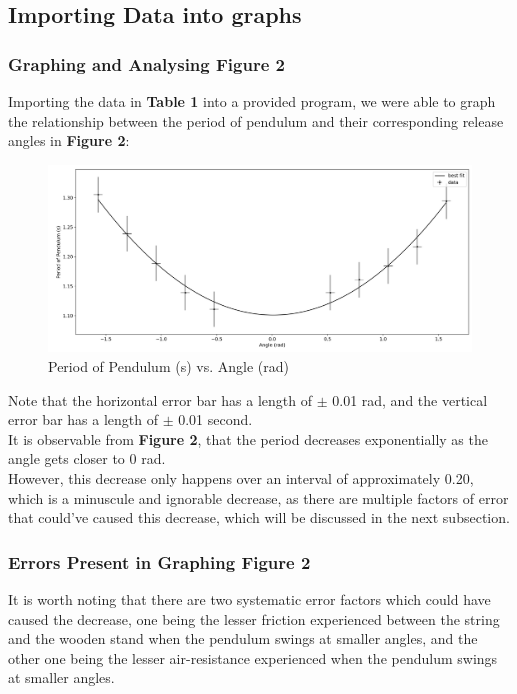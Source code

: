 \documentclass{article}
\begin{document}
\subsection{Importing Data into graphs}

\subsubsection{Graphing and Analysing Figure 2}

Importing the data in \textbf{Table 1} into a provided program, we were able to graph the relationship between the period of pendulum and their corresponding release angles in \textbf{Figure 2}:\\

\begin{figure}[!htb]
	\includegraphics[scale=0.4]{fig_angle.png}
	\caption{Period of Pendulum (s) vs. Angle (rad)}
	\label{fig_angle}
\end{figure}

\noindent Note that the horizontal error bar has a length of $\pm$ 0.01 rad, and the vertical error bar has a length of $\pm$ 0.01 second. \\

\noindent It is observable from \textbf{Figure 2}, that the period decreases exponentially as the angle gets closer to 0 rad. \\

\noindent However, this decrease only happens over an interval of approximately 0.20, which is a minuscule and ignorable decrease, as there are multiple factors of error that could've caused this decrease, which will be discussed in the next subsection.

\subsubsection{Errors Present in Graphing Figure 2}

It is worth noting that there are two systematic error factors which could have caused the decrease, one being the lesser friction experienced between the string and the wooden stand when the pendulum swings at smaller angles, and the other one being the lesser air-resistance experienced when the pendulum swings at smaller angles.
\end{document}
